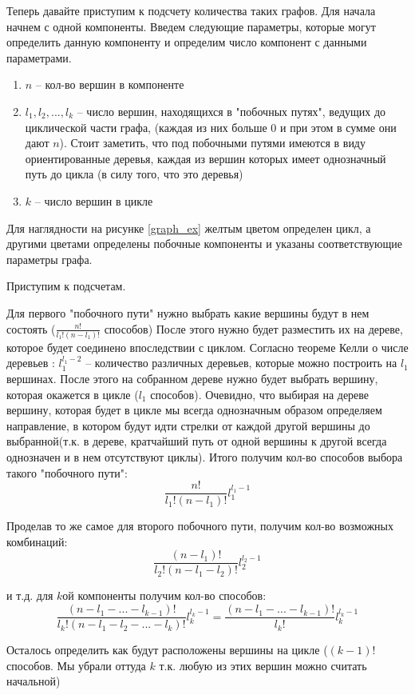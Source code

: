 \documentclass[10pt, a4paper]{report}
\theoremstyle{definition}
\begin{document}
Теперь давайте приступим к подсчету количества таких графов. Для начала начнем с одной компоненты. Введем следующие параметры, которые могут определить данную компоненту и определим число компонент с данными параметрами.

\begin{enumerate}
\item $n$ -- кол-во вершин в компоненте
\item $l_1, l_2, ..., l_k$ -- число вершин, находящихся в "побочных путях"{}, ведущих до циклической части графа, (каждая из них больше $0$ и при этом в сумме они дают $n$). Стоит заметить, что под побочными путями имеются в виду ориентированные деревья, каждая из вершин которых имеет однозначный путь до цикла (в силу того, что это деревья)
\item $k$ -- число вершин в цикле
\end{enumerate}
Для наглядности на рисунке \ref{graph_ex} желтым цветом определен цикл, а другими цветами определены побочные компоненты и указаны соответствующие параметры графа.


Приступим к подсчетам.

Для первого "побочного пути"{} нужно выбрать какие вершины  будут в нем состоять ($\frac{n!}{l_1!(n - l_1)!}$ способов) После этого нужно будет разместить их на дереве, которое будет соединено впоследствии с циклом. Согласно теореме Келли о числе деревьев : $l_1^{l_1-2}$ -- количество различных деревьев, которые можно построить на $l_1$ вершинах. После этого на собранном дереве нужно будет выбрать вершину, которая окажется в цикле ($l_1$ способов). Очевидно, что выбирая на дереве вершину, которая будет в цикле мы всегда однозначным образом определяем направление, в котором будут идти стрелки от каждой другой вершины до выбранной(т.к. в дереве, кратчайший путь от одной вершины к другой всегда однозначен и в нем отсутствуют циклы). Итого получим кол-во способов выбора такого "побочного пути":
$$\frac{n!}{l_1!(n- l_1)!} l_1^{l_1-1}$$


Проделав то же самое для второго побочного пути, получим кол-во возможных комбинаций:
$$\frac{(n- l_1)!}{l_2!(n- l_1 - l_2)!} l_2^{l_2-1}$$


 и т.д. для $k$ой компоненты получим кол-во способов:
$$
\frac{(n - l_1 - ... -l_{k-1})!}{l_k!(n - l_1 - l_2 - ... - l_k)!} l_k^{l_k-1}=
\frac{(n - l_1 - ... -l_{k-1})!}{l_k!}l_k^{l_k-1}
$$

Осталось определить как будут расположены вершины на цикле ($(k-1)!$ способов. Мы убрали оттуда $k$ т.к. любую из этих вершин можно считать начальной)
\end{document}
